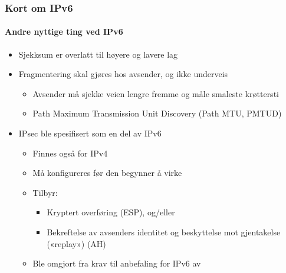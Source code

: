 \begin{frame}%
  \frametitle{Kort om IPv6}
  \framesubtitle{Andre nyttige ting ved IPv6}
  \begin{itemize}[<+->]
  \item Sjekksum er overlatt til høyere og lavere lag
  \item Fragmentering skal gjøres hos avsender, og ikke underveis
    \begin{itemize}[<+->]
    \item Avsender må sjekke veien lengre fremme og måle smaleste krøttersti
    \item Path Maximum Transmission Unit Discovery (Path MTU, PMTUD)
    \end{itemize}
  \item IPsec ble spesifisert som en del av IPv6
    \begin{itemize}[<+->]
    \item Finnes også for IPv4
    \item Må konfigureres før den begynner å virke
    \item Tilbyr:
      \begin{itemize}[<+->]
      \item Kryptert overføring (ESP), og/eller
      \item Bekreftelse av avsenders identitet og beskyttelse mot
        gjentakelse («replay») (AH)
      \end{itemize}
    \item Ble omgjort fra krav til anbefaling for IPv6 av 
    \end{itemize}
  \end{itemize}
\end{frame}

